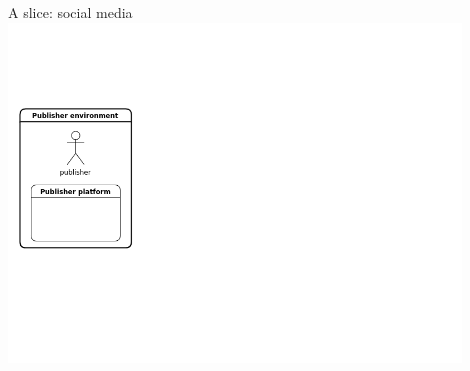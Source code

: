 \documentclass[xcolor=svgnames]{beamer}
\begin{document}

        \begin{frame}{A slice: social media}
            \includegraphics[width=0.9\textwidth]{img/h1}
        \end{frame}
\end{document}
